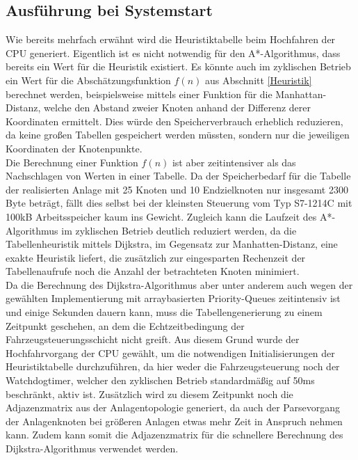 	
		\subsection{Ausführung bei Systemstart}
			
			Wie bereits mehrfach erwähnt wird die Heuristiktabelle beim Hochfahren der CPU generiert. Eigentlich ist es nicht notwendig für den A*-Algorithmus, dass bereits ein Wert für die Heuristik existiert. Es könnte auch im zyklischen Betrieb ein Wert für die Abschätzungsfunktion $f(n)$ aus Abschnitt \ref{Heuristik} berechnet werden, beispielsweise mittels einer Funktion für die Manhattan-Distanz, welche den Abstand zweier Knoten anhand der Differenz derer Koordinaten ermittelt. Dies würde den Speicherverbrauch erheblich reduzieren, da keine großen Tabellen gespeichert werden müssten, sondern nur die jeweiligen Koordinaten der Knotenpunkte.
			\\
			Die Berechnung einer Funktion $f(n)$ ist aber zeitintensiver als das Nachschlagen von Werten in einer Tabelle. Da der Speicherbedarf für die Tabelle der realisierten Anlage mit 25 Knoten und 10 Endzielknoten nur insgesamt 2300 Byte beträgt, fällt dies selbst bei der kleinsten Steuerung vom Typ S7-1214C mit 100kB Arbeitsspeicher kaum ins Gewicht. Zugleich kann die Laufzeit des A*-Algorithmus im zyklischen Betrieb deutlich reduziert werden, da die Tabellenheuristik mittels Dijkstra, im Gegensatz zur Manhatten-Distanz, eine exakte Heuristik liefert, die zusätzlich zur eingesparten Rechenzeit der Tabellenaufrufe noch die Anzahl der betrachteten Knoten minimiert.
			\\
			Da die Berechnung des Dijkstra-Algorithmus aber unter anderem auch wegen der gewählten Implementierung mit arraybasierten Priority-Queues zeitintensiv ist \cite{BorisCherkassky1993} und einige Sekunden dauern kann, muss die Tabellengenerierung zu einem Zeitpunkt geschehen, an dem die Echtzeitbedingung der Fahrzeugsteuerungsschicht nicht greift. Aus diesem Grund wurde der Hochfahrvorgang der CPU gewählt, um die notwendigen Initialisierungen der Heuristiktabelle durchzuführen, da hier weder die Fahrzeugsteuerung noch der Watchdogtimer, welcher den zyklischen Betrieb standardmäßig auf 50ms beschränkt, aktiv ist. Zusätzlich wird zu diesem Zeitpunkt noch die Adjazenzmatrix aus der Anlagentopologie generiert, da auch der Parsevorgang der Anlagenknoten bei größeren Anlagen etwas mehr Zeit in Anspruch nehmen kann. Zudem kann somit die Adjazenzmatrix für die schnellere Berechnung des Dijkstra-Algorithmus verwendet werden.
				
